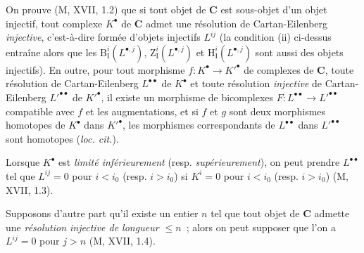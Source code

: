\begin{env}[11.4.2]
On prouve (M, XVII, 1.2) que si tout objet de $\boldsymbol{C}$ est sous-objet
d'un objet injectif, tout complexe $K^\bullet$ de $\boldsymbol{C}$ admet une
résolution de Cartan-Eilenberg \emph{injective}, c'est-à-dire formée d'objets
injectifs $L^{ij}$ (la condition (ii) ci-dessus entraîne alors que les
$\mathrm B_{\mathrm I}^i(L^{\bullet,j})$,
$\mathrm Z_{\mathrm I}^i(L^{\bullet,j})$ et
$\mathrm H_{\mathrm I}^i(L^{\bullet,j})$ sont aussi des objets injectifs).
En outre, pour tout morphisme $f:K^\bullet\to K'^\bullet$ de complexes de
$\boldsymbol{C}$, toute résolution de Cartan-Eilenberg $L^{\bullet\bullet}$ de
$K^\bullet$ et toute résolution \emph{injective} de Cartan-Eilenberg
$L'^{\bullet\bullet}$ de $K'^\bullet$, il existe un morphisme de bicomplexes
$F:L^{\bullet\bullet}\to L'^{\bullet\bullet}$ compatible avec $f$ et les
augmentations, et si $f$ et $g$ sont deux morphismes homotopes de $K^\bullet$
dans $K'^\bullet$, les morphismes correspondants de $L^{\bullet\bullet}$
dans $L'^{\bullet\bullet}$ sont homotopes (\emph{loc. cit.}).

Lorsque $K^\bullet$ est \emph{limité inférieurement} (resp.
\emph{supérieurement}), on peut prendre $L^{\bullet\bullet}$ tel que
$L^{ij}=0$ pour $i<i_0$ (resp. $i>i_0$) si $K^i=0$ pour $i<i_0$ (resp.
$i>i_0$) (M, XVII, 1.3).

Supposons d'autre part qu'il existe un entier $n$ tel que tout objet de
$\boldsymbol{C}$ admette une \emph{résolution injective de longueur $\leq n$}~;
alors on peut supposer que l'on a $L^{ij}=0$ pour $j>n$ (M, XVII, 1.4).
\end{env}

